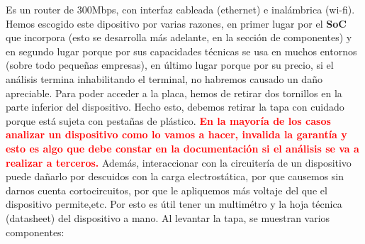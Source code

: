\documentclass[12pt,a4paper, brazil]{article}
\begin{document}
Es un router de 300Mbps, con interfaz cableada (ethernet) e inalámbrica (wi-fi). Hemos escogido este dipositivo por varias razones, en primer lugar por el \textbf{SoC} que incorpora (esto se desarrolla más adelante, en la sección de componentes) y en segundo lugar porque por sus capacidades técnicas se usa en muchos entornos (sobre todo pequeñas empresas), en último lugar porque por su precio, si el análisis termina inhabilitando el terminal, no habremos causado un daño apreciable. Para poder acceder a la placa, hemos de retirar dos tornillos en la parte inferior del dispositivo. Hecho esto, debemos retirar la tapa con cuidado porque está sujeta con pestañas de plástico. \textbf{\textcolor{red}{En la mayoría de los casos analizar un dispositivo como lo vamos a hacer, invalida la garantía y esto es algo que debe constar en la documentación si el análisis se va a realizar a terceros.}} Además, interaccionar con la circuitería de un dispositivo puede dañarlo por descuidos con la carga electrostática, por que causemos sin darnos cuenta cortocircuitos, por que le apliquemos más voltaje del que el dispositivo permite,etc. Por esto es útil tener un multimétro y la hoja técnica (datasheet) del dispositivo a mano. Al levantar la tapa, se muestran varios componentes:
\end{document}
